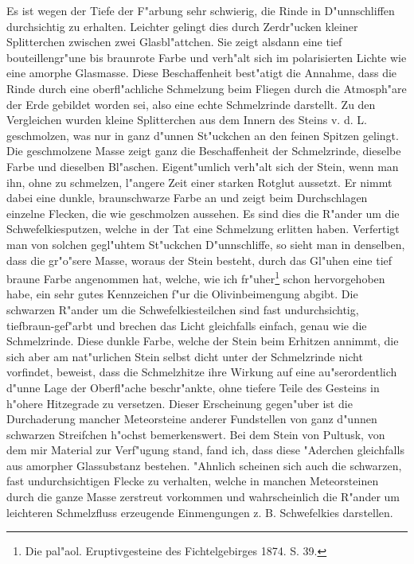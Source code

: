 \documentclass[a4paper, 11pt, oneside]{article}
\begin{document}
Es ist wegen der Tiefe der F"arbung sehr schwierig, die Rinde in D"unnschliffen durchsichtig zu erhalten. Leichter gelingt dies durch Zerdr"ucken kleiner Splitterchen zwischen zwei Glasbl"attchen. Sie zeigt alsdann eine tief bouteillengr"une bis braunrote Farbe und verh"alt sich im polarisierten Lichte wie eine amorphe Glasmasse. Diese Beschaffenheit best"atigt die Annahme, dass die Rinde durch eine oberfl"achliche Schmelzung beim Fliegen durch die Atmosph"are der Erde gebildet worden sei, also eine echte Schmelzrinde darstellt. Zu den Vergleichen wurden kleine Splitterchen aus dem Innern des Steins v. d. L. geschmolzen, was nur in ganz d"unnen St"uckchen an den feinen Spitzen gelingt. Die geschmolzene Masse zeigt ganz die Beschaffenheit der Schmelzrinde, dieselbe Farbe und dieselben Bl"aschen. Eigent"umlich verh"alt sich der Stein, wenn man ihn, ohne zu schmelzen, l"angere Zeit einer starken Rotglut aussetzt. Er nimmt dabei eine dunkle, braunschwarze Farbe an und zeigt beim Durchschlagen einzelne Flecken, die wie geschmolzen aussehen. Es sind dies die R"ander um die Schwefelkiesputzen, welche in der Tat eine Schmelzung erlitten haben. Verfertigt man von solchen gegl"uhtem St"uckchen D"unnschliffe, so sieht man in denselben, dass die gr"o"sere Masse, woraus der Stein besteht, durch das Gl"uhen eine tief braune Farbe angenommen hat, welche, wie ich fr"uher\footnote{Die pal"aol. Eruptivgesteine des Fichtelgebirges 1874. S. 39.} schon hervorgehoben habe, ein sehr gutes Kennzeichen f"ur die Olivinbeimengung abgibt. Die schwarzen R"ander um die Schwefelkiesteilchen sind fast undurchsichtig, tiefbraun-gef"arbt und brechen das Licht gleichfalls einfach, genau wie die Schmelzrinde. Diese dunkle Farbe, welche der Stein beim Erhitzen annimmt, die sich aber am nat"urlichen Stein selbst dicht unter der Schmelzrinde nicht vorfindet, beweist, dass die Schmelzhitze ihre Wirkung auf eine au"serordentlich d"unne Lage der Oberfl"ache beschr"ankte, ohne tiefere Teile des Gesteins in h"ohere Hitzegrade zu versetzen. Dieser Erscheinung gegen"uber ist die Durchaderung mancher Meteorsteine anderer Fundstellen von ganz d"unnen schwarzen Streifchen h"ochst bemerkenswert. Bei dem Stein von Pultusk, von dem mir Material zur Verf"ugung stand, fand ich, dass diese "Aderchen gleichfalls aus amorpher Glassubstanz bestehen. "Ahnlich scheinen sich auch die schwarzen, fast undurchsichtigen Flecke zu verhalten, welche in manchen Meteorsteinen durch die ganze Masse zerstreut vorkommen und wahrscheinlich die R"ander um leichteren Schmelzfluss erzeugende Einmengungen z. B. Schwefelkies darstellen.
\end{document}
